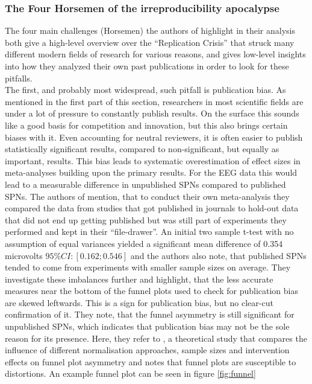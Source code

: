 \documentclass{article}
\begin{document}
\subsubsection{The Four Horsemen of the irreproducibility apocalypse}
The four main challenges (Horsemen) the authors of \cite{brainrecordings} highlight in their analysis both give a high-level overview over the ``Replication Crisis'' that struck many different modern fields of research for various reasons, and gives low-level insights into how they analyzed their own past publications in order to look for these pitfalls. \\
The first, and probably most widespread, such pitfall is publication bias. As mentioned in the first part of this section, researchers in most scientific fields are under a lot of pressure to constantly publish results. On the surface this sounds like a good basis for competition and innovation, but this also brings certain biases with it. Even accounting for neutral reviewers, it is often easier to publish statistically significant results, compared to non-significant, but equally as important, results. This bias leads to systematic overestimation of effect sizes in meta-analyses building upon the primary results. For the EEG data this would lead to a measurable difference in unpublished SPNs compared to published SPNs. The authors of \cite{brainrecordings} mention, that to conduct their own meta-analysis they compared the data from studies that got published in journals to hold-out data that did not end up getting published but was still part of experiments they performed and kept in their ``file-drawer''. An initial two sample t-test with no assumption of equal variances yielded a significant mean difference of 0.354 microvolts $95\%CI:[0.162; 0.546]$ and the authors also note, that published SPNs tended to come from experiments with smaller sample sizes on average. They investigate these imbalances further and highlight, that the less accurate measures near the bottom of the funnel plots used to check for publication bias are skewed leftwards. This is a sign for publication bias, but no clear-cut confirmation of it. They note, that the funnel asymmetry is still significant for unpublished SPNs, which indicates that publication bias may not be the sole reason for its presence. Here, they refer to \cite{zwetsloot}, a theoretical study that compares the influence of different normalisation approaches, sample sizes and intervention effects on funnel plot asymmetry and notes that funnel plots are susceptible to distortions. An example funnel plot can be seen in figure \ref{fig:funnel} \\
\end{document}
